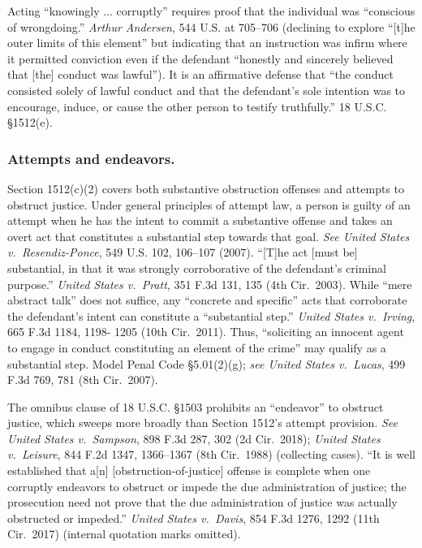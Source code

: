 Acting “knowingly ... corruptly” requires proof that the individual was “conscious of wrongdoing.”
\textit{Arthur Andersen}, 544 U.S. at 705--706 (declining to explore “[t]he outer limits of this element” but indicating that an instruction was infirm where it permitted conviction even if the defendant “honestly and sincerely believed that [the] conduct was lawful”).
It is an affirmative defense that “the conduct consisted solely of lawful conduct and that the defendant’s sole intention was to encourage, induce, or cause the other person to testify truthfully.”
18 U.S.C. \S 1512(e).

\subsubsection*{Attempts and endeavors.}

Section 1512(c)(2) covers both substantive obstruction offenses and attempts to obstruct justice. Under general principles of attempt law, a person is guilty of an attempt when he has the intent to commit a substantive offense and takes an overt act that constitutes a substantial step towards that goal.
\textit{See United States v.\ Resendiz-Ponce}, 549 U.S. 102, 106--107 (2007).
“[T]he act [must be] substantial, in that it was strongly corroborative of the defendant’s criminal purpose.”
\textit{United States v.\ Pratt}, 351 F.3d 131, 135 (4th Cir.~2003).
While “mere abstract talk” does not suffice, any “concrete and specific” acts that corroborate the defendant’s intent can constitute a “substantial step.”
\textit{United States v.\ Irving}, 665 F.3d 1184, 1198- 1205 (10th Cir.~2011).
Thus, “soliciting an innocent agent to engage in conduct constituting an element of the crime” may qualify as a substantial step.
Model Penal Code \S 5.01(2)(g);
\textit{see United States v.\ Lucas}, 499 F.3d 769, 781 (8th Cir.~2007).

The omnibus clause of 18 U.S.C. \S 1503 prohibits an “endeavor” to obstruct justice, which sweeps more broadly than Section 1512’s attempt provision.
\textit{See United States v.\ Sampson}, 898 F.3d 287, 302 (2d Cir.~2018);
\textit{United States v.\ Leisure}, 844 F.2d 1347, 1366--1367 (8th Cir.~1988) (collecting cases).
“It is well established that a[n] [obstruction-of-justice] offense is complete when one corruptly endeavors to obstruct or impede the due administration of justice;
the prosecution need not prove that the due administration of justice was actually obstructed or impeded.”
\textit{United States v.\ Davis}, 854 F.3d 1276, 1292 (11th Cir.~2017) (internal quotation marks omitted).


